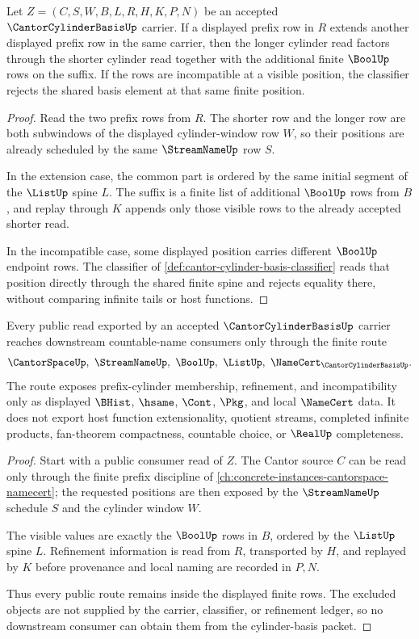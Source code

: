 \begin{theorem}
\label{thm:cantor-cylinder-basis-prefix-refinement}
Let $Z=(C,S,W,B,L,R,H,K,P,N)$ be an accepted
$\CantorCylinderBasisUp$ carrier. If a displayed prefix row in $R$ extends
another displayed prefix row in the same carrier, then the longer cylinder
read factors through the shorter cylinder read together with the additional
finite $\BoolUp$ rows on the suffix. If the rows are incompatible at a visible
position, the classifier rejects the shared basis element at that same finite
position.
\end{theorem}
\begin{proof}
Read the two prefix rows from $R$. The shorter row and the longer row are both
subwindows of the displayed cylinder-window row $W$, so their positions are
already scheduled by the same $\StreamNameUp$ row $S$.

In the extension case, the common part is ordered by the same initial segment
of the $\ListUp$ spine $L$. The suffix is a finite list of additional
$\BoolUp$ rows from $B$, and replay through $K$ appends only those visible
rows to the already accepted shorter read.

In the incompatible case, some displayed position carries different
$\BoolUp$ endpoint rows. The classifier of
\autoref{def:cantor-cylinder-basis-classifier} reads that position directly
through the shared finite spine and rejects equality there, without comparing
infinite tails or host functions.
\end{proof}

\begin{theorem}
\label{thm:cantor-cylinder-basis-streamname-scope}
Every public read exported by an accepted $\CantorCylinderBasisUp$ carrier
reaches downstream countable-name consumers only through the finite route
$$
\CantorSpaceUp,\ \StreamNameUp,\ \BoolUp,\ \ListUp,\ \NameCert_{\CantorCylinderBasisUp}.
$$
The route exposes prefix-cylinder membership, refinement, and incompatibility
only as displayed $\BHist$, $\hsame$, $\Cont$, $\Pkg$, and local $\NameCert$
data. It does not export host function extensionality, quotient streams,
completed infinite products, fan-theorem compactness, countable choice, or
$\RealUp$ completeness.
\end{theorem}
\begin{proof}
Start with a public consumer read of $Z$. The Cantor source $C$ can be read
only through the finite prefix discipline of
\autoref{ch:concrete-instances-cantorspace-namecert}; the requested positions
are then exposed by the $\StreamNameUp$ schedule $S$ and the cylinder window
$W$.

The visible values are exactly the $\BoolUp$ rows in $B$, ordered by the
$\ListUp$ spine $L$. Refinement information is read from $R$, transported by
$H$, and replayed by $K$ before provenance and local naming are recorded in
$P,N$.

Thus every public route remains inside the displayed finite rows. The excluded
objects are not supplied by the carrier, classifier, or refinement ledger, so
no downstream consumer can obtain them from the cylinder-basis packet.
\end{proof}

